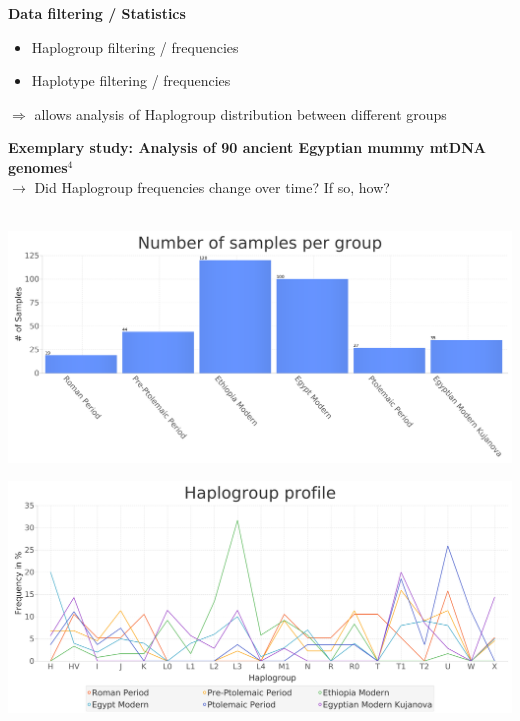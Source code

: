 \documentclass[a0paper,portrait]{baposter}
\begin{document}
\begin{poster}
{\begin{minipage}[t]{0.5\textwidth}
	\end{minipage}
	\hspace{0.5em}
	\begin{minipage}[t]{0.5\textwidth}
		\textbf{Data filtering / Statistics}
		\begin{itemize}[leftmargin=*]
			\item Haplogroup filtering / frequencies
			\item Haplotype filtering / frequencies
		\end{itemize}
	\end{minipage}
\begin{center}$\Rightarrow$ allows analysis of Haplogroup distribution between different groups\end{center}
	\vspace{1em}

\textbf{Exemplary study: Analysis of 90 ancient Egyptian mummy mtDNA genomes$^4$}\\\vspace{4mm}
$\rightarrow$ Did Haplogroup frequencies change over time? If so, how?\\
\\
	\begin{minipage}{0.5\textwidth}
		\includegraphics[width=\textwidth]{figures/group_sizes2.png}
	\end{minipage}
	\begin{minipage}{0.5\textwidth}
			\includegraphics[width=\textwidth]{figures/profile.png}
	\end{minipage}

}
\end{poster}
\end{document}
